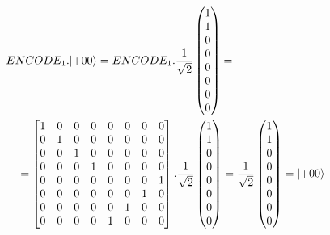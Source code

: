 \documentclass[11pt,oneside,a4paper]{article}
\begin{document}
\begin{equation}
\begin{multlined}
    ENCODE_1 . \ket{+00} = ENCODE_1 .
    \frac{1}{\sqrt{2}}\begin{pmatrix}1\\1\\0\\0\\0\\0\\0\\0\end{pmatrix} = \\
    = \begin{bmatrix}
    1 & 0 & 0 & 0 & 0 & 0 & 0 & 0\\
    0 & 1 & 0 & 0 & 0 & 0 & 0 & 0\\
    0 & 0 & 1 & 0 & 0 & 0 & 0 & 0\\
    0 & 0 & 0 & 1 & 0 & 0 & 0 & 0\\
    0 & 0 & 0 & 0 & 0 & 0 & 0 & 1\\
    0 & 0 & 0 & 0 & 0 & 0 & 1 & 0\\
    0 & 0 & 0 & 0 & 0 & 1 & 0 & 0\\
    0 & 0 & 0 & 0 & 1 & 0 & 0 & 0
    \end{bmatrix} . \frac{1}{\sqrt{2}}\begin{pmatrix}1\\1\\0\\0\\0\\0\\0\\0\end{pmatrix} = \frac{1}{\sqrt{2}}\begin{pmatrix}1\\1\\0\\0\\0\\0\\0\\0\end{pmatrix} = \ket{+00}
\end{multlined}
\label{eq:simple_encode_+00}
\end{equation}
\end{document}
